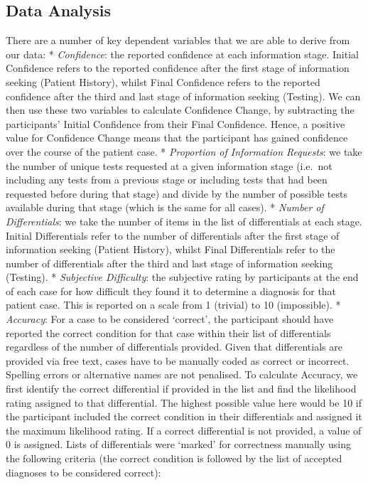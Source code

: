 \documentclass[a4paper, nobind]{templates/ociamthesis}
\begin{document}
\subsection*{Data Analysis}\label{data-analysis}

There are a number of key dependent variables that we are able to derive from our data:
* \emph{Confidence}: the reported confidence at each information stage. Initial Confidence refers to the reported confidence after the first stage of information seeking (Patient History), whilst Final Confidence refers to the reported confidence after the third and last stage of information seeking (Testing). We can then use these two variables to calculate Confidence Change, by subtracting the participants' Initial Confidence from their Final Confidence. Hence, a positive value for Confidence Change means that the participant has gained confidence over the course of the patient case.
* \emph{Proportion of Information Requests}: we take the number of unique tests requested at a given information stage (i.e.~not including any tests from a previous stage or including tests that had been requested before during that stage) and divide by the number of possible tests available during that stage (which is the same for all cases).
* \emph{Number of Differentials}: we take the number of items in the list of differentials at each stage. Initial Differentials refer to the number of differentials after the first stage of information seeking (Patient History), whilst Final Differentials refer to the number of differentials after the third and last stage of information seeking (Testing).
* \emph{Subjective Difficulty}: the subjective rating by participants at the end of each case for how difficult they found it to determine a diagnosis for that patient case. This is reported on a scale from 1 (trivial) to 10 (impossible).
* \emph{Accuracy}: For a case to be considered `correct', the participant should have reported the correct condition for that case within their list of differentials regardless of the number of differentials provided. Given that differentials are provided via free text, cases have to be manually coded as correct or incorrect. Spelling errors or alternative names are not penalised. To calculate Accuracy, we first identify the correct differential if provided in the list and find the likelihood rating assigned to that differential. The highest possible value here would be 10 if the participant included the correct condition in their differentials and assigned it the maximum likelihood rating. If a correct differential is not provided, a value of 0 is assigned. Lists of differentials were `marked' for correctness manually using the following criteria (the correct condition is followed by the list of accepted diagnoses to be considered correct):
\end{document}
